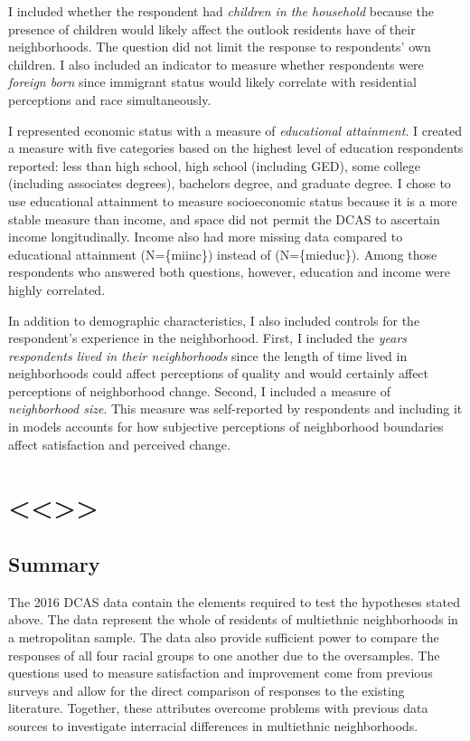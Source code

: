 \documentclass{baderart}
\begin{document}
I included whether the respondent had \emph{children in the household}
because the presence of children would likely affect the outlook
residents have of their neighborhoods. The question did not limit the
response to respondents' own children. I also included an indicator to
measure whether respondents were \emph{foreign born} since immigrant
status would likely correlate with residential perceptions and race
simultaneously.

I represented economic status with a measure of \emph{educational
attainment}. I created a measure with five categories based on the
highest level of education respondents reported: less than high school,
high school (including GED), some college (including associates
degrees), bachelors degree, and graduate degree. I chose to use
educational attainment to measure socioeconomic status because it is a
more stable measure than income, and space did not permit the DCAS to
ascertain income longitudinally. Income also had more missing data
compared to educational attainment (N=\{miinc\}) instead of
(N=\{mieduc\}). Among those respondents who answered both questions,
however, education and income were highly correlated.

In addition to demographic characteristics, I also included controls for
the respondent's experience in the neighborhood. First, I included the
\emph{years respondents lived in their neighborhoods} since the length
of time lived in neighborhoods could affect perceptions of quality and
would certainly affect perceptions of neighborhood change. Second, I
included a measure of \emph{neighborhood size}. This measure was
self-reported by respondents and including it in models accounts for how
subjective perceptions of neighborhood boundaries affect satisfaction
and perceived change.

\section{\textless{}\textless{}\textgreater{}\textgreater{}}\label{section-1}

\subsection{Summary}\label{summary}

The 2016 DCAS data contain the elements required to test the hypotheses
stated above. The data represent the whole of residents of multiethnic
neighborhoods in a metropolitan sample. The data also provide sufficient
power to compare the responses of all four racial groups to one another
due to the oversamples. The questions used to measure satisfaction and
improvement come from previous surveys and allow for the direct
comparison of responses to the existing literature. Together, these
attributes overcome problems with previous data sources to investigate
interracial differences in multiethnic neighborhoods.
\end{document}
